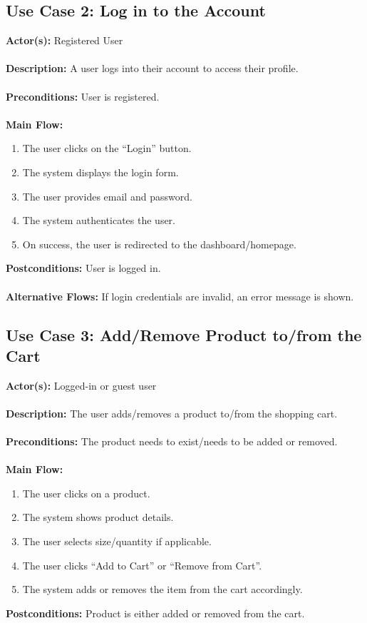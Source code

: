 \documentclass[a4paper,12pt]{article}
\begin{document}
    \subsection*{Use Case 2: Log in to the Account}
	\textbf{Actor(s):} Registered User \\ \\
	\textbf{Description:} A user logs into their account to access their profile. \\ \\
	\textbf{Preconditions:} User is registered. \\ \\
	\textbf{Main Flow:}
	\begin{enumerate}
  		\item The user clicks on the ``Login'' button.
  		\item The system displays the login form.
  		\item The user provides email and password.
  		\item The system authenticates the user.
  		\item On success, the user is redirected to the dashboard/homepage.
	\end{enumerate}
	\textbf{Postconditions:} User is logged in. \\ \\
	\textbf{Alternative Flows:} If login credentials are invalid, an error message is shown.




	\subsection*{Use Case 3: Add/Remove Product to/from the Cart}
	\textbf{Actor(s):} Logged-in or guest user \\ \\
	\textbf{Description:} The user adds/removes a product to/from the shopping cart. \\ \\
	\textbf{Preconditions:} The product needs to exist/needs to be added or removed. \\ \\
	\textbf{Main Flow:}
	\begin{enumerate}
  		\item The user clicks on a product.
  		\item The system shows product details.
  		\item The user selects size/quantity if applicable.
  		\item The user clicks ``Add to Cart'' or ``Remove from Cart''.
  		\item The system adds or removes the item from the cart accordingly.
	\end{enumerate}
	\textbf{Postconditions:} Product is either added or removed from the cart.
\end{document}
